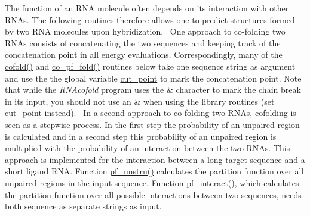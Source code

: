 The function of an R\+NA molecule often depends on its interaction with other R\+N\+As. The following routines therefore allows one to predict structures formed by two R\+NA molecules upon hybridization.~\newline
One approach to co-\/folding two R\+N\+As consists of concatenating the two sequences and keeping track of the concatenation point in all energy evaluations. Correspondingly, many of the \hyperlink{group__mfe__cofold_gabc8517f22cfe70595ee81fc837910d52}{cofold()} and \hyperlink{part__func__co_8h_ae5c1e7331718669bdae7a86de2be6184}{co\+\_\+pf\+\_\+fold()} routines below take one sequence string as argument and use the the global variable \hyperlink{fold__vars_8h_ab9b2c3a37a5516614c06d0ab54b97cda}{cut\+\_\+point} to mark the concatenation point. Note that while the {\itshape R\+N\+Acofold} program uses the \textquotesingle{}\&\textquotesingle{} character to mark the chain break in its input, you should not use an \textquotesingle{}\&\textquotesingle{} when using the library routines (set \hyperlink{fold__vars_8h_ab9b2c3a37a5516614c06d0ab54b97cda}{cut\+\_\+point} instead).~\newline
In a second approach to co-\/folding two R\+N\+As, cofolding is seen as a stepwise process. In the first step the probability of an unpaired region is calculated and in a second step this probability of an unpaired region is multiplied with the probability of an interaction between the two R\+N\+As. This approach is implemented for the interaction between a long target sequence and a short ligand R\+NA. Function \hyperlink{group__up__cofold_ga5b4ee40e190d2f633cd01cf0d2fe93cf}{pf\+\_\+unstru()} calculates the partition function over all unpaired regions in the input sequence. Function \hyperlink{group__up__cofold_ga1aa0aa02bc3a724f87360c03097afd00}{pf\+\_\+interact()}, which calculates the partition function over all possible interactions between two sequences, needs both sequence as separate strings as input. 